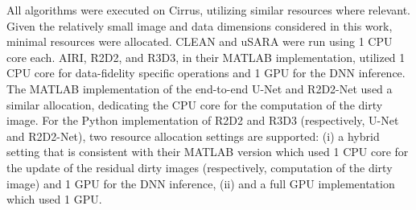 \documentclass[preprint2,twocolumn]{aastex631}
\begin{document}
All algorithms were executed on Cirrus, utilizing similar resources where relevant. Given the relatively small image and data dimensions considered in this work, minimal resources were allocated. CLEAN and uSARA were run using 1 CPU core each. AIRI, R2D2, and R3D3, in their MATLAB implementation, utilized 1 CPU core for data-fidelity specific operations and 1 GPU for the DNN inference. The MATLAB implementation of the end-to-end U-Net and R2D2-Net used a similar allocation, dedicating the CPU core for the computation of the dirty image. For the Python implementation of R2D2 and R3D3 (respectively, U-Net and R2D2-Net), two resource allocation settings are supported: (i) a hybrid setting that is consistent with their MATLAB version which used 1 CPU core for the update of the residual dirty images (respectively, computation of the dirty image) and 1 GPU for the DNN inference, (ii) and a full GPU implementation which used 1 GPU.

\end{document}
